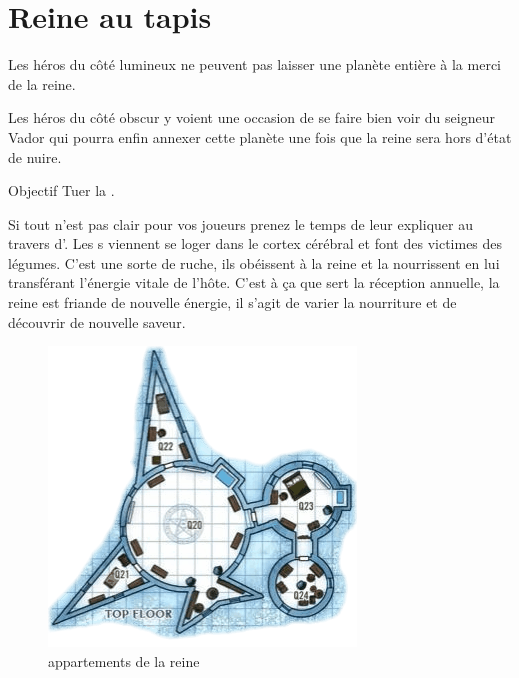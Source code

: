 \section{Reine au tapis}

\lettrine{\jedifont{\$}} Les héros du côté lumineux ne peuvent pas laisser une planète entière à la merci de la reine.

\lettrine{\jedifont{\#}} Les héros du côté obscur y voient une occasion de se faire bien voir du seigneur Vador qui pourra enfin annexer cette planète une fois que la reine sera hors d’état de nuire.

\begin{paperbox}{Objectif}
Tuer la .
\end{paperbox}

Si tout n’est pas clair pour vos joueurs prenez le temps de leur expliquer au travers d’. Les s viennent se loger dans le cortex cérébral et font des victimes des légumes. C’est une sorte de ruche, ils obéissent à la reine et la nourrissent en lui transférant l’énergie vitale de l’hôte. C’est à ça que sert la réception annuelle, la reine est friande de nouvelle énergie, il s’agit de varier la nourriture et de découvrir de nouvelle saveur.

\begin{figure}[h]
\noindent\includegraphics[width=\linewidth]{_img/places/queen-quarter.png}
\caption{appartements de la reine\label{fig:queen-quarter}}
\end{figure}

